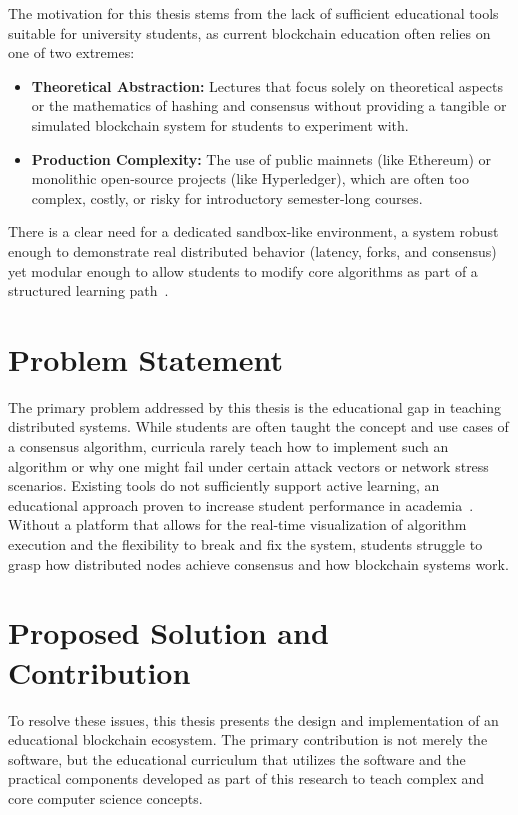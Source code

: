 The motivation for this thesis stems from the lack of sufficient educational tools suitable for university students, as current blockchain education often relies on one of two extremes:
\begin{itemize}
    \item \textbf{Theoretical Abstraction:} Lectures that focus solely on theoretical aspects or the mathematics of hashing and consensus without providing a tangible or simulated blockchain system for students to experiment with.
    \item \textbf{Production Complexity:} The use of public mainnets (like Ethereum) or monolithic open-source projects (like Hyperledger), which are often too complex, costly, or risky for introductory semester-long courses.
\end{itemize}
There is a clear need for a dedicated sandbox-like environment, a system robust enough to demonstrate real distributed behavior (latency, forks, and consensus) yet modular enough to allow students to modify core algorithms as part of a structured learning path~\cite{blockchainBasedEducation}.

\section{Problem Statement} \label{ch1_problem_statement}

The primary problem addressed by this thesis is the educational gap in teaching distributed systems. While students are often taught the concept and use cases of a consensus algorithm, curricula rarely teach how to implement such an algorithm or why one might fail under certain attack vectors or network stress scenarios. Existing tools do not sufficiently support active learning, an educational approach proven to increase student performance in academia~\cite{freeman2014active}. Without a platform that allows for the real-time visualization of algorithm execution and the flexibility to break and fix the system, students struggle to grasp how distributed nodes achieve consensus and how blockchain systems work.

\section{Proposed Solution and Contribution} \label{ch1_solution}

To resolve these issues, this thesis presents the design and implementation of an educational blockchain ecosystem. The primary contribution is not merely the software, but the educational curriculum that utilizes the software and the practical components developed as part of this research to teach complex and core computer science concepts.

